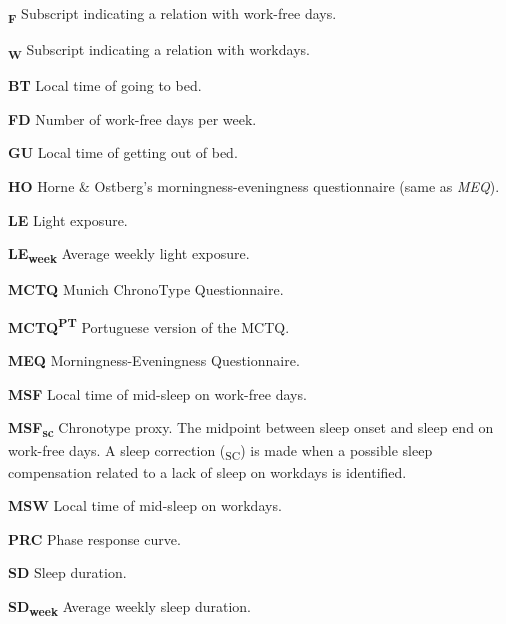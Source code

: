 \documentclass[
  12pt,
  a4paper,
  oneside]{tesesusp}
\renewcommand*\listtablename{List of Tables}
\newcommand\listtablename{List of Tables}
\begin{document}

\renewcommand{\listtablename}{LIST OF TABLES}
\pdfbookmark[0]{\listtablename}{lot}
\listoftables*
\cleardoublepage


\begin{siglas}
  \item[\textbf{\textsubscript{F}}] Subscript indicating a relation with
    work-free days.
  \item[\textbf{\textsubscript{W}}] Subscript indicating a relation with
    workdays.
  \item[\textbf{BT}] Local time of going to bed.
  \item[\textbf{FD}] Number of work-free days per week.
  \item[\textbf{GU}] Local time of getting out of bed.
  \item[\textbf{HO}] Horne \& Ostberg's morningness-eveningness questionnaire
    (same as \emph{MEQ}).
  \item[\textbf{LE}] Light exposure.
  \item[\textbf{LE\textsubscript{week}}] Average weekly light exposure.
  \item[\textbf{MCTQ}] Munich ChronoType Questionnaire.
  \item[\textbf{MCTQ\textsuperscript{PT}}] Portuguese version of the MCTQ.
  \item[\textbf{MEQ}] Morningness-Eveningness Questionnaire.
  \item[\textbf{MSF}] Local time of mid-sleep on work-free days.
  \item[\textbf{MSF\textsubscript{sc}}] Chronotype proxy. The midpoint between
    sleep onset and sleep end on work-free days. A sleep correction
    (\textsubscript{SC}) is made when a possible sleep compensation
    related to a lack of sleep on workdays is identified.
  \item[\textbf{MSW}] Local time of mid-sleep on workdays.
  \item[\textbf{PRC}] Phase response curve.
  \item[\textbf{SD}] Sleep duration.
  \item[\textbf{SD\textsubscript{week}}] Average weekly sleep duration.

\end{siglas}
\end{document}
